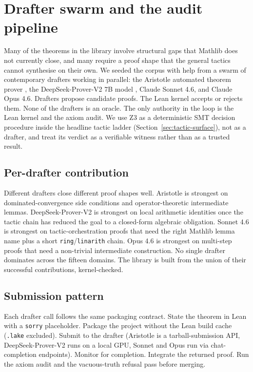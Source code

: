 \section{Drafter swarm and the audit pipeline}
\label{sec:aristotle}

Many of the theorems in the library involve structural gaps that
Mathlib does not currently close, and many require a proof shape
that the general tactics cannot synthesise on their own. We
seeded the corpus with help from a swarm of contemporary
drafters working in parallel: the Aristotle automated theorem
prover \citep{harmonic2025aristotle}, the DeepSeek-Prover-V2 7B
model \citep{deepseekprover2024v2}, Claude Sonnet 4.6, and Claude
Opus 4.6. Drafters propose candidate proofs. The Lean kernel
accepts or rejects them. None of the drafters is an oracle. The
only authority in the loop is the Lean kernel and the axiom
audit. We use Z3 as a deterministic SMT decision procedure
inside the headline tactic ladder
(Section~\ref{sec:tactic-surface}), not as a drafter, and treat
its verdict as a verifiable witness rather than as a trusted
result.

\subsection{Per-drafter contribution}
\label{sec:aristotle-contribution}

Different drafters close different proof shapes well. Aristotle
is strongest on dominated-convergence side conditions and
operator-theoretic intermediate lemmas. DeepSeek-Prover-V2 is
strongest on local arithmetic identities once the tactic chain
has reduced the goal to a closed-form algebraic obligation.
Sonnet 4.6 is strongest on tactic-orchestration proofs that
need the right Mathlib lemma name plus a short
\texttt{ring}/\texttt{linarith} chain. Opus 4.6 is strongest on
multi-step proofs that need a non-trivial intermediate
construction. No single drafter dominates across the fifteen
domains. The library is built from the union of their successful
contributions, kernel-checked.

\subsection{Submission pattern}
\label{sec:aristotle-pattern}

Each drafter call follows the same packaging contract. State the
theorem in Lean with a \texttt{sorry} placeholder. Package the
project without the Lean build cache (\texttt{.lake} excluded).
Submit to the drafter (Aristotle is a tarball-submission API,
DeepSeek-Prover-V2 runs on a local GPU, Sonnet and Opus run via
chat-completion endpoints). Monitor for completion. Integrate
the returned proof. Run the axiom audit and the vacuous-truth
refusal pass before merging.

